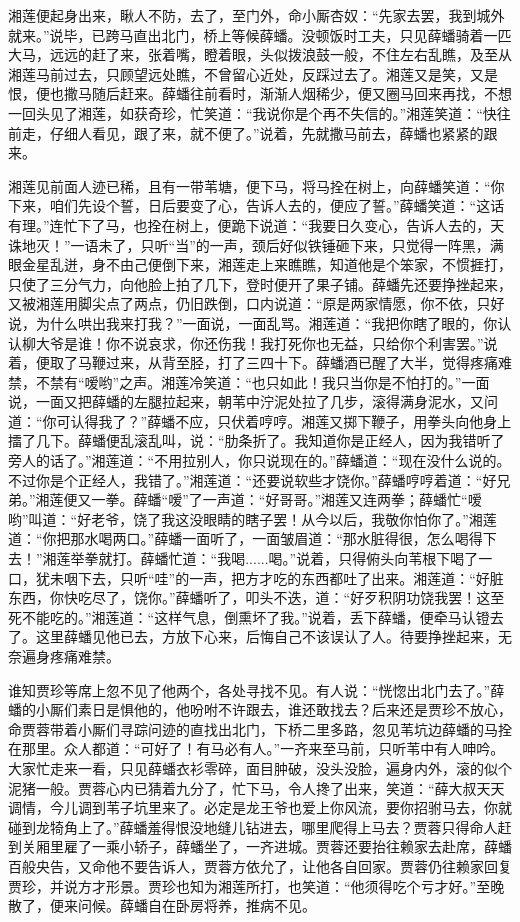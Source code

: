 \documentclass[12pt,oneside]{book}
\begin{document}
湘莲便起身出来，瞅人不防，去了，至门外，命小厮杏奴：“先家去罢，我到城外就来。”说毕，已跨马直出北门，桥上等候薛蟠。没顿饭时工夫，只见薛蟠骑着一匹大马，远远的赶了来，张着嘴，瞪着眼，头似拨浪鼓一般，不住左右乱瞧，及至从湘莲马前过去，只顾望远处瞧，不曾留心近处，反踩过去了。湘莲又是笑，又是恨，便也撒马随后赶来。薛蟠往前看时，渐渐人烟稀少，便又圈马回来再找，不想一回头见了湘莲，如获奇珍，忙笑道：“我说你是个再不失信的。”湘莲笑道：“快往前走，仔细人看见，跟了来，就不便了。”说着，先就撒马前去，薛蟠也紧紧的跟来。

湘莲见前面人迹已稀，且有一带苇塘，便下马，将马拴在树上，向薛蟠笑道：“你下来，咱们先设个誓，日后要变了心，告诉人去的，便应了誓。”薛蟠笑道：“这话有理。”连忙下了马，也拴在树上，便跪下说道：“我要日久变心，告诉人去的，天诛地灭！”一语未了，只听“当”的一声，颈后好似铁锤砸下来，只觉得一阵黑，满眼金星乱迸，身不由己便倒下来，湘莲走上来瞧瞧，知道他是个笨家，不惯捱打，只使了三分气力，向他脸上拍了几下，登时便开了果子铺。薛蟠先还要挣挫起来，又被湘莲用脚尖点了两点，仍旧跌倒，口内说道：“原是两家情愿，你不依，只好说，为什么哄出我来打我？”一面说，一面乱骂。湘莲道：“我把你瞎了眼的，你认认柳大爷是谁！你不说哀求，你还伤我！我打死你也无益，只给你个利害罢。”说着，便取了马鞭过来，从背至胫，打了三四十下。薛蟠酒已醒了大半，觉得疼痛难禁，不禁有“嗳哟”之声。湘莲冷笑道：“也只如此！我只当你是不怕打的。”一面说，一面又把薛蟠的左腿拉起来，朝苇中泞泥处拉了几步，滚得满身泥水，又问道：“你可认得我了？”薛蟠不应，只伏着哼哼。湘莲又掷下鞭子，用拳头向他身上擂了几下。薛蟠便乱滚乱叫，说：“肋条折了。我知道你是正经人，因为我错听了旁人的话了。”湘莲道：“不用拉别人，你只说现在的。”薛蟠道：“现在没什么说的。不过你是个正经人，我错了。”湘莲道：“还要说软些才饶你。”薛蟠哼哼着道：“好兄弟。”湘莲便又一拳。薛蟠“嗳”了一声道：“好哥哥。”湘莲又连两拳；薛蟠忙“嗳哟”叫道：“好老爷，饶了我这没眼睛的瞎子罢！从今以后，我敬你怕你了。”湘莲道：“你把那水喝两口。”薛蟠一面听了，一面皱眉道：“那水脏得很，怎么喝得下去！”湘莲举拳就打。薛蟠忙道：“我喝......喝。”说着，只得俯头向苇根下喝了一口，犹未咽下去，只听“哇”的一声，把方才吃的东西都吐了出来。湘莲道：“好脏东西，你快吃尽了，饶你。”薛蟠听了，叩头不迭，道：“好歹积阴功饶我罢！这至死不能吃的。”湘莲道：“这样气息，倒熏坏了我。”说着，丢下薛蟠，便牵马认镫去了。这里薛蟠见他已去，方放下心来，后悔自己不该误认了人。待要挣挫起来，无奈遍身疼痛难禁。

谁知贾珍等席上忽不见了他两个，各处寻找不见。有人说：“恍惚出北门去了。”薛蟠的小厮们素日是惧他的，他吩咐不许跟去，谁还敢找去？后来还是贾珍不放心，命贾蓉带着小厮们寻踪问迹的直找出北门，下桥二里多路，忽见苇坑边薛蟠的马拴在那里。众人都道：“可好了！有马必有人。”一齐来至马前，只听苇中有人呻吟。大家忙走来一看，只见薛蟠衣衫零碎，面目肿破，没头没脸，遍身内外，滚的似个泥猪一般。贾蓉心内已猜着九分了，忙下马，令人搀了出来，笑道：“薛大叔天天调情，今儿调到苇子坑里来了。必定是龙王爷也爱上你风流，要你招驸马去，你就碰到龙犄角上了。”薛蟠羞得恨没地缝儿钻进去，哪里爬得上马去？贾蓉只得命人赶到关厢里雇了一乘小轿子，薛蟠坐了，一齐进城。贾蓉还要抬往赖家去赴席，薛蟠百般央告，又命他不要告诉人，贾蓉方依允了，让他各自回家。贾蓉仍往赖家回复贾珍，并说方才形景。贾珍也知为湘莲所打，也笑道：“他须得吃个亏才好。”至晚散了，便来问候。薛蟠自在卧房将养，推病不见。
\end{document}
